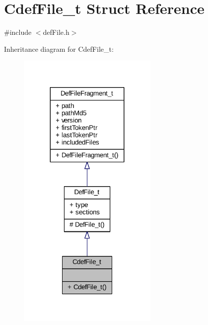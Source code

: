 \hypertarget{struct_cdef_file__t}{}\section{Cdef\+File\+\_\+t Struct Reference}
\label{struct_cdef_file__t}


{\ttfamily \#include $<$def\+File.\+h$>$}



Inheritance diagram for Cdef\+File\+\_\+t\+:
\nopagebreak
\begin{figure}[H]
\begin{center}
\leavevmode
\includegraphics[width=191pt]{struct_cdef_file__t__inherit__graph}
\end{center}
\end{figure}


